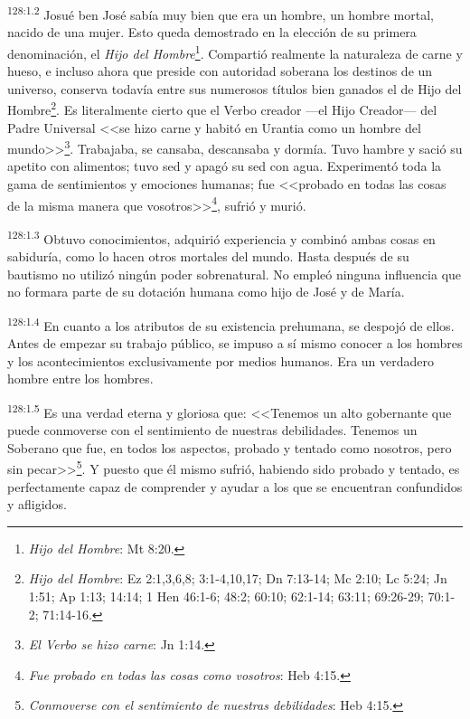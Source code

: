 \par 
\textsuperscript{128:1.2} Josué ben José sabía muy bien que era un hombre, un hombre mortal, nacido de una mujer. Esto queda demostrado en la elección de su primera denominación, el \textit{Hijo del Hombre}\footnote{\textit{Hijo del Hombre}: Mt 8:20.}. Compartió realmente la naturaleza de carne y hueso, e incluso ahora que preside con autoridad soberana los destinos de un universo, conserva todavía entre sus numerosos títulos bien ganados el de Hijo del Hombre\footnote{\textit{Hijo del Hombre}: Ez 2:1,3,6,8; 3:1-4,10,17; Dn 7:13-14; Mc 2:10; Lc 5:24; Jn 1:51; Ap 1:13; 14:14; 1 Hen 46:1-6; 48:2; 60:10; 62:1-14; 63:11; 69:26-29; 70:1-2; 71:14-16.}. Es literalmente cierto que el Verbo creador ---el Hijo Creador--- del Padre Universal <<se hizo carne y habitó en Urantia como un hombre del mundo>>\footnote{\textit{El Verbo se hizo carne}: Jn 1:14.}. Trabajaba, se cansaba, descansaba y dormía. Tuvo hambre y sació su apetito con alimentos; tuvo sed y apagó su sed con agua. Experimentó toda la gama de sentimientos y emociones humanas; fue <<probado en todas las cosas de la misma manera que vosotros>>\footnote{\textit{Fue probado en todas las cosas como vosotros}: Heb 4:15.}, sufrió y murió.

\par 
\textsuperscript{128:1.3} Obtuvo conocimientos, adquirió experiencia y combinó ambas cosas en sabiduría, como lo hacen otros mortales del mundo. Hasta después de su bautismo no utilizó ningún poder sobrenatural. No empleó ninguna influencia que no formara parte de su dotación humana como hijo de José y de María.

\par 
\textsuperscript{128:1.4} En cuanto a los atributos de su existencia prehumana, se despojó de ellos. Antes de empezar su trabajo público, se impuso a sí mismo conocer a los hombres y los acontecimientos exclusivamente por medios humanos. Era un verdadero hombre entre los hombres.

\par 
\textsuperscript{128:1.5} Es una verdad eterna y gloriosa que: <<Tenemos un alto gobernante que puede conmoverse con el sentimiento de nuestras debilidades. Tenemos un Soberano que fue, en todos los aspectos, probado y tentado como nosotros, pero sin pecar>>\footnote{\textit{Conmoverse con el sentimiento de nuestras debilidades}: Heb 4:15.}. Y puesto que él mismo sufrió, habiendo sido probado y tentado, es perfectamente capaz de comprender y ayudar a los que se encuentran confundidos y afligidos.

